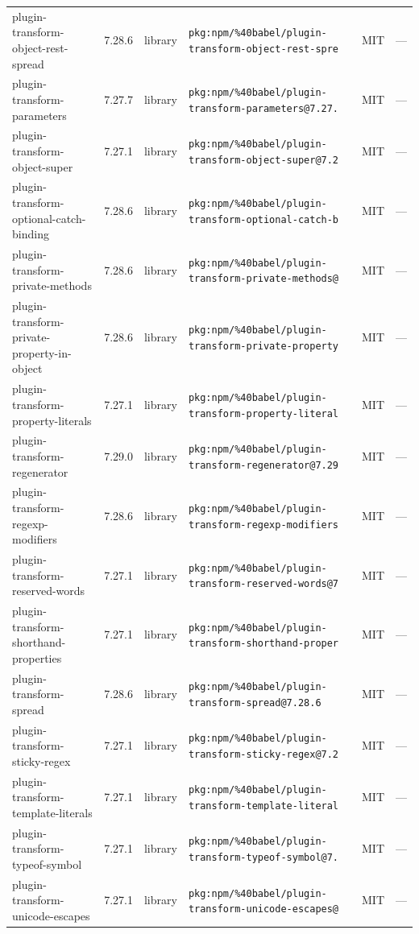 \documentclass[11pt]{article}
\begin{document}
\begin{longtable}{|l|l|l|p{2.2cm}|l|p{4cm}|}
plugin-transform-object-rest-spread & 7.28.6 & library & \texttt{pkg:npm/\%40babel/plugin-transform-object-rest-spre} & MIT & — \\
plugin-transform-parameters & 7.27.7 & library & \texttt{pkg:npm/\%40babel/plugin-transform-parameters@7.27.} & MIT & — \\
plugin-transform-object-super & 7.27.1 & library & \texttt{pkg:npm/\%40babel/plugin-transform-object-super@7.2} & MIT & — \\
plugin-transform-optional-catch-binding & 7.28.6 & library & \texttt{pkg:npm/\%40babel/plugin-transform-optional-catch-b} & MIT & — \\
plugin-transform-private-methods & 7.28.6 & library & \texttt{pkg:npm/\%40babel/plugin-transform-private-methods@} & MIT & — \\
plugin-transform-private-property-in-object & 7.28.6 & library & \texttt{pkg:npm/\%40babel/plugin-transform-private-property} & MIT & — \\
plugin-transform-property-literals & 7.27.1 & library & \texttt{pkg:npm/\%40babel/plugin-transform-property-literal} & MIT & — \\
plugin-transform-regenerator & 7.29.0 & library & \texttt{pkg:npm/\%40babel/plugin-transform-regenerator@7.29} & MIT & — \\
plugin-transform-regexp-modifiers & 7.28.6 & library & \texttt{pkg:npm/\%40babel/plugin-transform-regexp-modifiers} & MIT & — \\
plugin-transform-reserved-words & 7.27.1 & library & \texttt{pkg:npm/\%40babel/plugin-transform-reserved-words@7} & MIT & — \\
plugin-transform-shorthand-properties & 7.27.1 & library & \texttt{pkg:npm/\%40babel/plugin-transform-shorthand-proper} & MIT & — \\
plugin-transform-spread & 7.28.6 & library & \texttt{pkg:npm/\%40babel/plugin-transform-spread@7.28.6} & MIT & — \\
plugin-transform-sticky-regex & 7.27.1 & library & \texttt{pkg:npm/\%40babel/plugin-transform-sticky-regex@7.2} & MIT & — \\
plugin-transform-template-literals & 7.27.1 & library & \texttt{pkg:npm/\%40babel/plugin-transform-template-literal} & MIT & — \\
plugin-transform-typeof-symbol & 7.27.1 & library & \texttt{pkg:npm/\%40babel/plugin-transform-typeof-symbol@7.} & MIT & — \\
plugin-transform-unicode-escapes & 7.27.1 & library & \texttt{pkg:npm/\%40babel/plugin-transform-unicode-escapes@} & MIT & — \\

\end{longtable}
\end{document}
